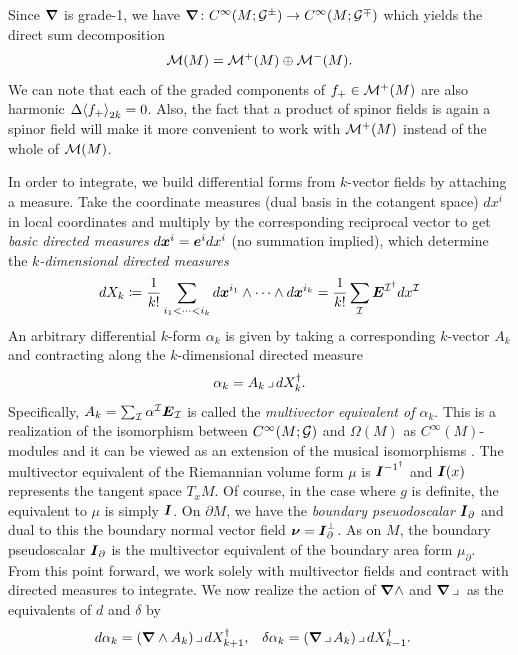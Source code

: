 \documentclass{article}
\begin{document}
Since $\boldsymbol{\nabla}$ is grade-1, we have $\boldsymbol{\nabla} \colon C^\infty(M;\mathcal{G}^{\pm}) \to C^\infty(M;\mathcal{G}^\mp)$ which yields the direct sum decomposition
\begin{equation}
    \mathcal{M}(M) = \mathcal{M}^+(M) \oplus \mathcal{M}^-(M).
\end{equation}
We can note that each of the graded components of $f_+\in \mathcal{M}^+(M)$ are also harmonic $\Delta \proj{2k}{f_+}=0$. Also, the fact that a product of spinor fields is again a spinor field will make it more convenient to work with $\mathcal{M}^+(M)$ instead of the whole of $\mathcal{M}(M)$. 

In order to integrate, we build differential forms from $k$-vector fields by attaching a measure. Take the coordinate measures (dual basis in the cotangent space) $dx^i$ in local coordinates and multiply by the corresponding reciprocal vector to get \emph{basic directed measures} $d\boldsymbol{x}^i = \boldsymbol{e}^i dx^i$ (no summation implied), which determine the \emph{$k$-dimensional directed measures}
\begin{equation}
    dX_k \coloneqq \frac{1}{k!} \sum_{i_1 < \cdots < i_k} d\boldsymbol{x}^{i_1}\wedge \cdots \wedge d\boldsymbol{x}^{i_k} = \frac{1}{k!} \sum_{\mathcal{I}} \boldsymbol{E}^{\mathcal{I}^\dagger} dx^{\mathcal{I}}
\end{equation}
An arbitrary differential $k$-form $\alpha_k$ is given by taking a corresponding $k$-vector $A_k$ and contracting along the $k$-dimensional directed measure
\begin{equation}
\alpha_k = A_k \hspace*{.5mm}\lrcorner \hspace*{.5mm} dX_k^\dagger.
\end{equation}
Specifically, $A_k = \sum_{\mathcal{I}} \alpha^{\mathcal{I}} \boldsymbol{E}_{\mathcal{I}}$ is called the \emph{multivector equivalent of $\alpha_k$}. This is a realization of the isomorphism between $C^\infty(M;\mathcal{G})$ and $\Omega(M)$ as $C^\infty(M)$-modules and it can be viewed as an extension of the musical isomorphisms \cite[chapter 13]{lee_introduction_2012}. The multivector equivalent of the Riemannian volume form $\mu$ is $\boldsymbol{I}^{-1^\dagger}$ and $\boldsymbol{I}(x)$ represents the tangent space $T_x M$. Of course, in the case where $g$ is definite, the equivalent to $\mu$ is simply $\boldsymbol{I}$. On $\partial M$, we have the \emph{boundary pseuodoscalar} $\boldsymbol{I}_\partial$ and dual to this the boundary normal vector field $\boldsymbol{\nu} = \boldsymbol{I}_\partial^\perp$. As on $M$, the boundary pseudoscalar $\boldsymbol{I}_\partial$ is the multivector equivalent of the boundary area form $\mu_\partial$. From this point forward, we work solely with multivector fields and contract with directed measures to integrate. We now realize the action of $\boldsymbol{\nabla} \wedge$ and $\boldsymbol{\nabla} \hspace*{.5mm}\lrcorner \hspace*{.5mm}$ as the equivalents of $d$ and $\delta$ by
\begin{align}
d \alpha_k &= (\boldsymbol{\nabla} \wedge A_k) \hspace*{.5mm}\lrcorner \hspace*{.5mm} dX_{k+1}^\dagger, & \delta \alpha_k &= (\boldsymbol{\nabla} \hspace*{.5mm}\lrcorner \hspace*{.5mm} A_k)\hspace*{.5mm}\lrcorner \hspace*{.5mm} dX_{k-1}^\dagger.
\end{align}
\end{document}
